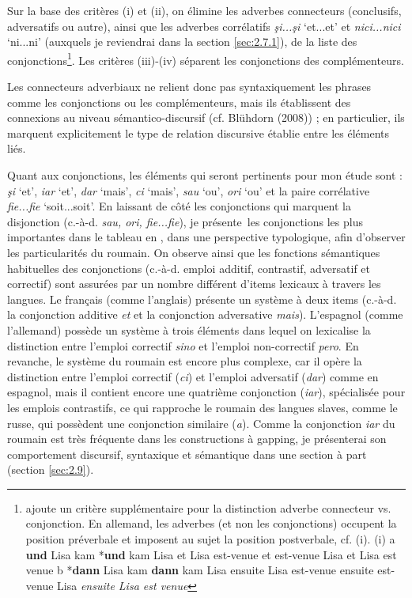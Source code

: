 Sur la base des critères (i) et (ii), on élimine les adverbes connecteurs (conclusifs, adversatifs ou autre), ainsi que les adverbes corrélatifs \textit{şi...şi} `et...et' et \textit{nici...nici} `ni...ni' (auxquels je reviendrai dans la section \ref{sec:2.7.1}), de la liste des conjonctions\footnote{\citet{Haspelmath2007} ajoute un critère supplémentaire pour la distinction adverbe connecteur vs. conjonction. En allemand, les adverbes (et non les conjonctions) occupent la position préverbale et imposent au sujet la position postverbale, cf. (i).
(i)  a  \textbf{und}  Lisa  kam  {\textbar} *\textbf{und}  kam  Lisa
et  Lisa  est-venue  {\textbar} et  est-venue  Lisa
et Lisa est venue
  b  *\textbf{dann}  Lisa  kam  {\textbar} \textbf{dann}  kam  Lisa
    ensuite  Lisa  est-venue  {\textbar} ensuite  est-venue  Lisa
    \textit{ensuite Lisa est venue}}. Les critères (iii)-(iv) séparent les conjonctions des complémenteurs.

Les connecteurs adverbiaux ne relient donc pas syntaxiquement les phrases comme les conjonctions ou les complémenteurs, mais ils établissent des connexions au niveau sémantico-discursif (cf. Blühdorn (2008)) ; en particulier, ils marquent explicitement le type de relation discursive établie entre les éléments liés.  

Quant aux conjonctions, les éléments qui seront pertinents pour mon étude sont : \textit{şi} `et', \textit{iar} `et', \textit{dar} `mais', \textit{ci} `mais', \textit{sau} `ou', \textit{ori} `ou' et la paire corrélative \textit{fie...fie} `soit...soit'. En laissant de côté les conjonctions qui marquent la disjonction (c.-à-d. \textit{sau, ori, fie...fie}), je présente~les conjonctions les plus importantes dans le tableau en , dans une perspective typologique, afin d'observer les particularités du roumain. On observe ainsi que les fonctions sémantiques habituelles des conjonctions (c.-à-d. emploi additif, contrastif, adversatif et correctif) sont assurées par un nombre différent d'items lexicaux à travers les langues. Le français (comme l'anglais) présente un système à deux items (c.-à-d. la conjonction additive \textit{et} et la conjonction adversative \textit{mais}). L'espagnol (comme l'allemand) possède un système à trois éléments dans lequel on lexicalise la distinction entre l'emploi correctif \textit{sino} et l'emploi non-correctif \textit{pero}. En revanche, le système du roumain est encore plus complexe, car il opère la distinction entre l'emploi correctif (\textit{ci}) et l'emploi adversatif (\textit{dar}) comme en espagnol, mais il contient encore une quatrième conjonction (\textit{iar}), spécialisée pour les emplois contrastifs, ce qui rapproche le roumain des langues slaves, comme le russe, qui possèdent une conjonction similaire (\textit{a}). Comme la conjonction \textit{iar} du roumain est très fréquente dans les constructions à gapping, je présenterai son comportement discursif, syntaxique et sémantique dans une section à part (section \ref{sec:2.9}).  



